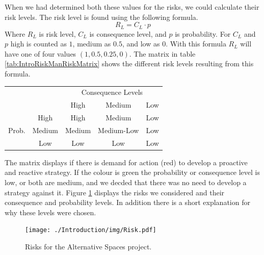 When we had determined both these values for the risks, we could calculate their risk levels. The risk level is found using the following formula.
\begin{equation}
R_L = C_L \cdot p
\end{equation}
Where \( R_L \) is risk level, \( C_L \) is consequence level, and \( p \) is probability. For \( C_L \) and \( p \) high is counted as \( 1 \), medium as \( 0.5 \), and low as \( 0 \). With this formula \( R_L \) will have one of four values \( (1, 0.5, 0.25, 0) \). The matrix in table \ref{tab:IntroRiskManRiskMatrix} shows the different risk levels resulting from this formula.

\begin{minipage}{\linewidth}
\centering
\begin{tabular}{cc|c|c|c| }
  \cline{3-5}
  & & \multicolumn{3}{|c|}{Consequence Levels} \\ \cline{3-5}
  & & High & Medium & Low \\ \hline
  \multicolumn{1}{|c}{\multirow{3}{*}{Prob.}} & \multicolumn{1}{|c|}{High} & \cellcolor{red!30} High & \cellcolor{red!30} Medium & \cellcolor{green!15} Low \\ \cline{2-5}
  \multicolumn{1}{|c}{} & \multicolumn{1}{|c|}{Medium} & \cellcolor{red!30} Medium & \cellcolor{green!15} Medium-Low & \cellcolor{green!15} Low \\ \cline{2-5}
  \multicolumn{1}{|c}{} & \multicolumn{1}{|c|}{Low} & \cellcolor{green!15} Low & \cellcolor{green!15} Low & \cellcolor{green!15} Low \\ \cline{2-5}
  \hline
\end{tabular}
\end{minipage}

The matrix displays if there is demand for action (red) to develop a proactive and reactive strategy. If the colour is green the probability or consequence level is low, or both are medium, and we decded that there was no need to develop a strategy against it. Figure \ref{fig:IntroRiskManRisks} displays the risks we considered and their consequence and probability levels. In addition there is a short explanation for why these levels were chosen.

\begin{figure}
	\texttt{[image: ./Introduction/img/Risk.pdf]}
    \caption{Risks for the Alternative Spaces project.}
    \label{fig:IntroRiskManRisks}
\end{figure}